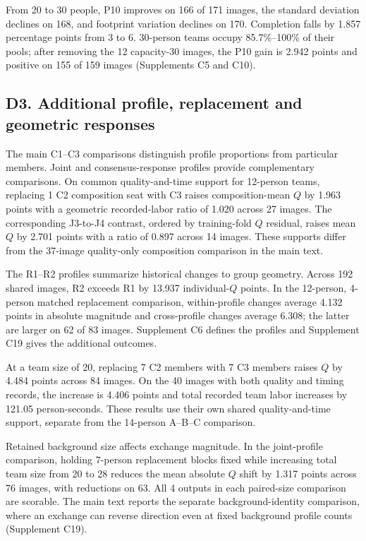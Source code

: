 From 20 to 30 people, P10 improves on 166 of 171 images, the standard deviation declines on 168, and footprint variation declines on 170. Completion falls by 1.857 percentage points from 3 to 6. 30-person teams occupy 85.7\%--100\% of their pools; after removing the 12 capacity-30 images, the P10 gain is 2.942 points and positive on 155 of 159 images (Supplements C5 and C10).

\subsection*{D3. Additional profile, replacement and geometric responses}
\label{supp:d3-composition}

The main C1--C3 comparisons distinguish profile proportions from particular members. Joint and consensus-response profiles provide complementary comparisons. On common quality-and-time support for 12-person teams, replacing 1 C2 composition seat with C3 raises composition-mean $Q$ by 1.963 points with a geometric recorded-labor ratio of 1.020 across 27 images. The corresponding J3-to-J4 contrast, ordered by training-fold $Q$ residual, raises mean $Q$ by 2.701 points with a ratio of 0.897 across 14 images. These supports differ from the 37-image quality-only composition comparison in the main text.

The R1--R2 profiles summarize historical changes to group geometry. Across 192 shared images, R2 exceeds R1 by 13.937 individual-$Q$ points. In the 12-person, 4-person matched replacement comparison, within-profile changes average 4.132 points in absolute magnitude and cross-profile changes average 6.308; the latter are larger on 62 of 83 images. Supplement C6 defines the profiles and Supplement C19 gives the additional outcomes.

At a team size of 20, replacing 7 C2 members with 7 C3 members raises $Q$ by 4.484 points across 84 images. On the 40 images with both quality and timing records, the increase is 4.406 points and total recorded team labor increases by 121.05 person-seconds. These results use their own shared quality-and-time support, separate from the 14-person A--B--C comparison.

Retained background size affects exchange magnitude. In the joint-profile comparison, holding 7-person replacement blocks fixed while increasing total team size from 20 to 28 reduces the mean absolute $Q$ shift by 1.317 points across 76 images, with reductions on 63. All 4 outputs in each paired-size comparison are scorable. The main text reports the separate background-identity comparison, where an exchange can reverse direction even at fixed background profile counts (Supplement C19).

